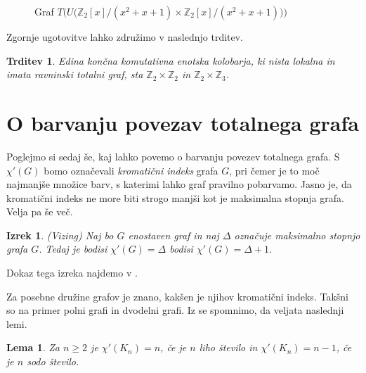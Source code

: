 \documentclass[a4paper, 12pt]{amsart}
\theoremstyle{definition} %
\theoremstyle{plain} %
\newtheorem{lema}[definicija]{Lema}
\newtheorem{izrek}[definicija]{Izrek}
\newtheorem{trditev}[definicija]{Trditev}
\newcommand{\Z}{\mathbb Z}
\begin{document}
\begin{enumerate}
\begin{figure}[h!]

\caption{Graf $T\big(U\big(\Z_2[x]/(x^2 + x + 1) \times \Z_2[x] / (x^2+x+1)\big)\big)$}
\label{T(U(R))}
\end{figure} 

\end{enumerate}

Zgornje ugotovitve lahko združimo v naslednjo trditev.

\begin{trditev}
Edina končna komutativna enotska kolobarja, ki nista lokalna in imata ravninski totalni graf, sta $\Z_2 \times \Z_2$ in $\Z_2 \times \Z_3$.
\end{trditev}

\section{O barvanju povezav totalnega grafa}
Poglejmo si sedaj še, kaj lahko povemo o barvanju povezev totalnega grafa. S $\chi'(G)$ bomo označevali \emph{kromatični indeks} grafa $G$, pri čemer je to moč najmanjše množice barv, s katerimi lahko graf pravilno pobarvamo. Jasno je, da kromatični indeks ne more biti strogo manjši kot je maksimalna stopnja grafa. Velja pa še več.

\begin{izrek}(Vizing)
\label{Vizing}
Naj bo $G$ enostaven graf in naj $\Delta$ označuje maksimalno stopnjo grafa $G$. Tedaj je bodisi $\chi'(G) = \Delta$ bodisi $\chi'(G) = \Delta + 1$.
\end{izrek}
Dokaz tega izreka najdemo v \cite[Theorem 5.3.2]{Diestel}.

Za posebne družine grafov je znano, kakšen je njihov kromatični indeks. Takšni so na primer polni grafi in dvodelni grafi. Iz \cite{diploma} se spomnimo, da veljata naslednji lemi.
\begin{lema}
\label{grafKn}
Za $n\ge 2$ je $\chi'(K_n) = n$, če je $n$ liho število in $\chi'(K_n) = n-1$, če je $n$ sodo število.
\end{lema}
\end{document}

